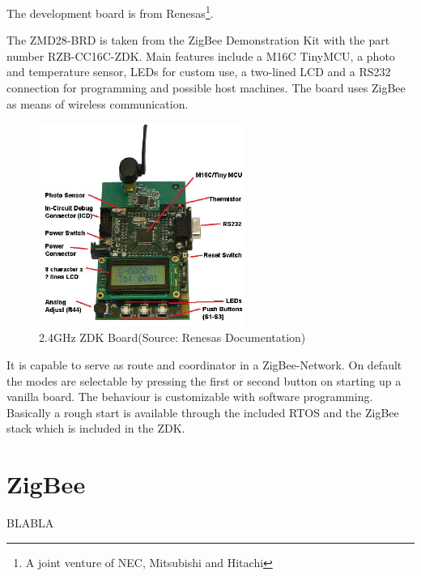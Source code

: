 The development board is from Renesas\footnote{A joint venture of NEC, Mitsubishi and Hitachi}. 

The ZMD28-BRD is taken from the ZigBee Demonstration Kit with the part number RZB-CC16C-ZDK.
Main features include a M16C TinyMCU, a photo and temperature sensor, LEDs for custom use, a two-lined LCD and a RS232
connection for programming and possible host machines. The board uses ZigBee as means of wireless communication.
\cite{RenesasZDK}

\begin{figure}[H]
   \centering
   \includegraphics[width=0.6\textwidth]{pic/wsn.png}%
   \caption{2.4GHz ZDK Board(Source: Renesas Documentation)}
   \label{wsnpic}%
\end{figure}

It is capable to serve as route and coordinator in a ZigBee-Network. On default the modes are selectable by
pressing the first or second button on starting up a vanilla board. The behaviour is customizable with 
software programming. Basically a rough start is available through the included RTOS and the ZigBee stack which
is included in the ZDK.

\section{ZigBee}

BLABLA
